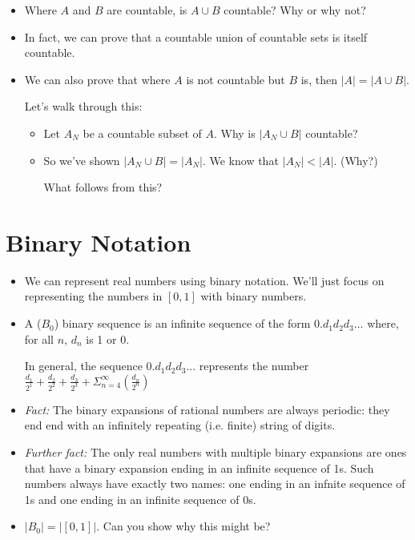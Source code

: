\documentclass[justified]{tufte-handout}
\begin{document}
\begin{itemize}


\item Where $A$ and $B$ are countable, is $A\cup B$ countable? Why or why not?


\item In fact, we can prove that a countable union of countable sets is itself countable.


\item We can also prove that where $A$ is not countable but $B$ is, then $|A|=|A\cup B|$.

Let's walk through this:

\begin{itemize}

\item Let $A_N$ be a countable subset of $A$. Why is $|A_N\cup B|$ countable?



\item So we've shown $|A_N\cup B| = |A_N|$. We know that $|A_N| < |A|$. (Why?)

What follows from this?


\end{itemize}




\end{itemize}


\section{Binary Notation}

\begin{itemize}

\item We can represent real numbers using binary notation. We'll just focus on representing the numbers in $[0,1]$ with binary numbers.

\item A ($B_0$) binary sequence is an infinite sequence of the form $0.d_1d_2d_3...$ where, for all $n$, $d_n$ is 1 or 0.


In general, the sequence $0.d_1d_2d_3...$ represents the number $\frac{d_1}{2^1}+\frac{d_2}{2^2} + \frac{d_3}{2^3} + \Sigma^{\infty}_{n=4}(\frac{d_n}{2^n})$
 


\item \emph{Fact:} The binary expansions of rational numbers are always periodic: they end end with an infinitely repeating (i.e. finite) string of digits.





\item \emph{Further fact:} The only real numbers with multiple binary expansions are ones that have a binary expansion ending in an infinite sequence of 1s. Such numbers always have exactly two names: one ending in an infnite sequence of 1s and one ending in an infinite sequence of 0s.



\item $|B_0| = |[0,1]|.$ Can you show why this might be?

\end{itemize}
\end{document}
